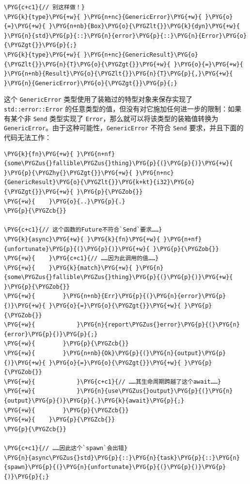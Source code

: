 \begin{Verbatim}[commandchars=\\\{\},breaklines=true,breakanywhere=true,fontsize=\codefont,xleftmargin=17bp]
\PYG{c+c1}{// 别这样做！}
\PYG{k}{type}\PYG{+w}{ }\PYG{n+nc}{GenericError}\PYG{+w}{ }\PYG{o}{=}\PYG{+w}{ }\PYG{n+nb}{Box}\PYG{o}{\PYGZlt{}}\PYG{k}{dyn}\PYG{+w}{ }\PYG{n}{std}\PYG{p}{::}\PYG{n}{error}\PYG{p}{::}\PYG{n}{Error}\PYG{o}{\PYGZgt{}}\PYG{p}{;}
\PYG{k}{type}\PYG{+w}{ }\PYG{n+nc}{GenericResult}\PYG{o}{\PYGZlt{}}\PYG{n}{T}\PYG{o}{\PYGZgt{}}\PYG{+w}{ }\PYG{o}{=}\PYG{+w}{ }\PYG{n+nb}{Result}\PYG{o}{\PYGZlt{}}\PYG{n}{T}\PYG{p}{,}\PYG{+w}{ }\PYG{n}{GenericError}\PYG{o}{\PYGZgt{}}\PYG{p}{;}
\end{Verbatim}

这个 \texttt{GenericError} 类型使用了装箱过的特型对象来保存实现了 \texttt{std::error::Error} 的任意类型的值，但没有对它施加任何进一步的限制：如果有某个非 \texttt{Send} 类型实现了 \texttt{Error}，那么就可以将该类型的装箱值转换为 \texttt{GenericError}。由于这种可能性，\texttt{GenericError} 不符合 \texttt{Send} 要求，并且下面的代码无法工作：

\begin{Verbatim}[commandchars=\\\{\},breaklines=true,breakanywhere=true,fontsize=\codefont,xleftmargin=17bp]
\PYG{k}{fn}\PYG{+w}{ }\PYG{n+nf}{some\PYGZus{}fallible\PYGZus{}thing}\PYG{p}{(}\PYG{p}{)}\PYG{+w}{ }\PYG{p}{\PYGZhy{}\PYGZgt{}}\PYG{+w}{ }\PYG{n+nc}{GenericResult}\PYG{o}{\PYGZlt{}}\PYG{k+kt}{i32}\PYG{o}{\PYGZgt{}}\PYG{+w}{ }\PYG{p}{\PYGZob{}}
\PYG{+w}{    }\PYG{o}{..}\PYG{p}{.}
\PYG{p}{\PYGZcb{}}

\PYG{c+c1}{// 这个函数的Future不符合`Send`要求……}
\PYG{k}{async}\PYG{+w}{ }\PYG{k}{fn}\PYG{+w}{ }\PYG{n+nf}{unfortunate}\PYG{p}{(}\PYG{p}{)}\PYG{+w}{ }\PYG{p}{\PYGZob{}}
\PYG{+w}{    }\PYG{c+c1}{// ……因为此调用的值……}
\PYG{+w}{    }\PYG{k}{match}\PYG{+w}{ }\PYG{n}{some\PYGZus{}fallible\PYGZus{}thing}\PYG{p}{(}\PYG{p}{)}\PYG{+w}{ }\PYG{p}{\PYGZob{}}
\PYG{+w}{        }\PYG{n+nb}{Err}\PYG{p}{(}\PYG{n}{error}\PYG{p}{)}\PYG{+w}{ }\PYG{o}{=}\PYG{o}{\PYGZgt{}}\PYG{+w}{ }\PYG{p}{\PYGZob{}}
\PYG{+w}{            }\PYG{n}{report\PYGZus{}error}\PYG{p}{(}\PYG{n}{error}\PYG{p}{)}\PYG{p}{;}
\PYG{+w}{        }\PYG{p}{\PYGZcb{}}
\PYG{+w}{        }\PYG{n+nb}{Ok}\PYG{p}{(}\PYG{n}{output}\PYG{p}{)}\PYG{+w}{ }\PYG{o}{=}\PYG{o}{\PYGZgt{}}\PYG{+w}{ }\PYG{p}{\PYGZob{}}
\PYG{+w}{            }\PYG{c+c1}{// ……其生命周期跨越了这个await……}
\PYG{+w}{            }\PYG{n}{use\PYGZus{}output}\PYG{p}{(}\PYG{n}{output}\PYG{p}{)}\PYG{p}{.}\PYG{k}{await}\PYG{p}{;}
\PYG{+w}{        }\PYG{p}{\PYGZcb{}}
\PYG{+w}{    }\PYG{p}{\PYGZcb{}}
\PYG{p}{\PYGZcb{}}

\PYG{c+c1}{// ……因此这个`spawn`会出错}
\PYG{n}{async\PYGZus{}std}\PYG{p}{::}\PYG{n}{task}\PYG{p}{::}\PYG{n}{spawn}\PYG{p}{(}\PYG{n}{unfortunate}\PYG{p}{(}\PYG{p}{)}\PYG{p}{)}\PYG{p}{;}
\end{Verbatim}

